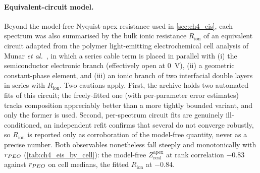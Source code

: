 \paragraph{Equivalent-circuit model.} Beyond the model-free Nyquist-apex
resistance used in \cref{sec:ch4_eis}, each spectrum was also summarised by the
bulk ionic resistance \(R_{\mathrm{ion}}\) of an equivalent circuit adapted from
the polymer light-emitting electrochemical cell analysis of Munar \textit{et
al.}~\cite{Munar2012}, in which a series cable term is placed in parallel with
(i) the semiconductor electronic branch (effectively open at \SI{0}{\volt}),
(ii) a geometric constant-phase element, and (iii) an ionic branch of two
interfacial double layers in series with \(R_{\mathrm{ion}}\). Two cautions
apply. First, the archive holds two automated fits of this circuit; the
freely-fitted one (with per-parameter error estimates) tracks composition
appreciably better than a more tightly bounded variant, and only the former is
used. Second, per-spectrum circuit fits are genuinely ill-conditioned, an
independent refit confirms that several do not converge robustly, so
\(R_{\mathrm{ion}}\) is reported only as corroboration of the model-free quantity,
never as a precise number. Both observables nonetheless fall steeply and
monotonically with \(r_{PEO{}}\) (\cref{tab:ch4_eis_by_cell}): the model-free
\(Z_{\mathrm{real}}^{\mathrm{apex}}\) at rank correlation \(-0.83\) against \(r_{PEO{}}\)
on cell medians, the fitted \(R_{\mathrm{ion}}\) at \(-0.84\).

